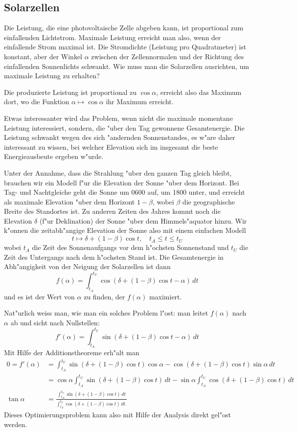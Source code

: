 \subsection{Solarzellen\label{uebersicht:solarzellen}}
Die Leistung, die eine photovoltaische Zelle abgeben kann, ist proportional
zum einfallenden Lichtstrom. Maximale Leistung erreicht man also,
wenn der einfallende Strom maximal ist. Die Stromdichte (Leistung 
pro Quadratmeter) ist konstant, aber der Winkel $\alpha$ zwischen der
Zellennormalen und der Richtung des einfallenden Sonnenlichts schwankt.
Wie muss man die Solarzellen ausrichten, um maximale Leistung zu erhalten?

Die produzierte Leistung ist proportional zu $\cos\alpha$, erreicht also
das Maximum dort, wo die Funktion $\alpha\mapsto\cos\alpha$ ihr
Maximum erreicht.

Etwas interessanter wird das Problem, wenn nicht die maximale momentane
Leistung interessiert, sondern, die "uber den Tag gewonnene Gesamtenergie.
Die Leistung schwankt wegen des sich "andernden Sonnenstandes, es w"are
daher interessant zu wissen, bei welcher Elevation sich im insgesamt
die beste Energieausbeute ergeben w"urde.

Unter der Annahme, dass die Strahlung "uber den ganzen Tag gleich bleibt,
brauchen wir ein Modell f"ur die Elevation der Sonne "uber dem Horizont.
Bei Tag- und Nachtgleiche geht die Sonne um 0600 auf, um 1800 unter,
und erreicht als maximale Elevation "uber dem Horizont $1-\beta$,
wobei $\beta$ die geographische Breite des Standortes ist.
Zu anderen Zeiten des Jahres kommt noch die Elevation $\delta$
(f"ur Deklination) der Sonne "uber dem Himmels"aquator hinzu.
Wir k"onnen die zeitabh"angige Elevation der Sonne also mit einem
einfachen Modell
\[
t\mapsto \delta + (1-\beta)\cos t,\quad t_A\le t\le t_U
\]
wobei $t_A$ die Zeit des Sonnenaufgangs vor dem h"ochsten Sonnenstand
und $t_U$ die Zeit des Untergangs nach dem h"ochsten Stand ist.
Die Gesamtenergie in Abh"angigkeit von der Neigung der
Solarzellen ist dann
\[
f(\alpha)=
\int_{t_A}^{t_U} \cos (\delta+(1-\beta)\cos t - \alpha)\,dt
\]
und es ist der Wert von $\alpha$ zu finden, der $f(\alpha)$
maximiert.

Nat"urlich weiss man, wie man ein solches Problem l"ost: man leitet
$f(\alpha)$ nach $\alpha$ ab und sicht nach Nullstellen:
\[
f'(\alpha)=\int_{t_A}^{t_U}
\sin(\delta + (1-\beta)\cos t-\alpha)
\,dt
\]
Mit Hilfe der Additionstheoreme erh"alt man
\begin{align*}
0=
f'(\alpha)
&=
\int_{t_A}^{t_U}
\sin(\delta + (1-\beta)\cos t)\cos\alpha
-
\cos(\delta + (1-\beta)\cos t)\sin\alpha
\,dt
\\
&=
\cos\alpha
\int_{t_A}^{t_U}
\sin(\delta + (1-\beta)\cos t)\,dt
-
\sin\alpha
\int_{t_A}^{t_U}
\cos(\delta + (1-\beta)\cos t)
\,dt
\\
\tan\alpha
&=
\frac{
\int_{t_A}^{t_U}
\sin(\delta + (1-\beta)\cos t)\,dt
}{
\int_{t_A}^{t_U}
\cos(\delta + (1-\beta)\cos t)\,dt.
}
\end{align*}
Dieses Optimierungsproblem kann also mit Hilfe der Analysis direkt
gel"ost werden.


